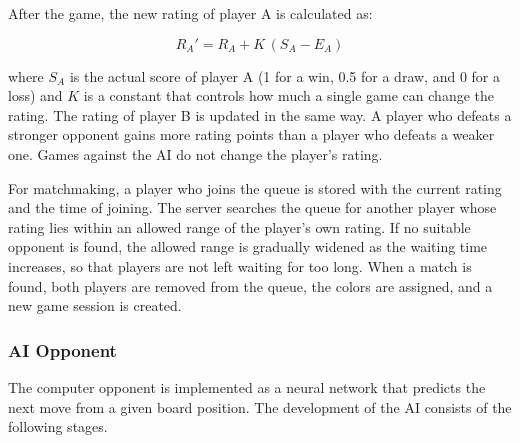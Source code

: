 After the game, the new rating of player A is calculated as:

\begin{equation}
R_A' = R_A + K\,(S_A - E_A)
\end{equation}

where $S_A$ is the actual score of player A (1 for a win, 0.5 for a draw, and 0 for a loss) and $K$ is a constant that controls how much a single game can change the rating. The rating of player B is updated in the same way. A player who defeats a stronger opponent gains more rating points than a player who defeats a weaker one. Games against the AI do not change the player's rating.

For matchmaking, a player who joins the queue is stored with the current rating and the time of joining. The server searches the queue for another player whose rating lies within an allowed range of the player's own rating. If no suitable opponent is found, the allowed range is gradually widened as the waiting time increases, so that players are not left waiting for too long. When a match is found, both players are removed from the queue, the colors are assigned, and a new game session is created.

\subsubsection{AI Opponent}
\label{sec:ai}

The computer opponent is implemented as a neural network that predicts the next move from a given board position. The development of the AI consists of the following stages.

